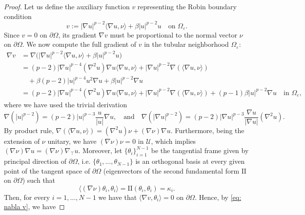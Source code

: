 \documentclass[10pt,a4paper, reqno]{amsart}
\numberwithin{equation}{section}
\begin{document}
\begin{proof}
    Let us define the auxiliary function $v$ representing the Robin boundary condition
    \begin{equation*}
    v := |\nabla u|^{p-2} \langle \nabla u, \nu \rangle + \beta |u|^{p-2}u \quad \text{on } \Omega_\varepsilon.
    \end{equation*}
    Since $v = 0$ on $\partial\Omega$, its gradient $\nabla v$ must be proportional to the normal vector $\nu$ on $\partial\Omega$. We now compute the full gradient of $v$ in the tubular neighborhood $\Omega_\varepsilon$:
    \begin{equation}\label{eq: nabla v}
        \begin{aligned}
        \nabla v &= \nabla \big( |\nabla u|^{p-2} \langle \nabla u, \nu \rangle + \beta |u|^{p-2}u \big)  \\
        &= (p-2)|\nabla u|^{p-4} (\nabla^2 u)\nabla u \langle \nabla u, \nu \rangle + |\nabla u|^{p-2} \nabla ( \langle \nabla u, \nu \rangle ) \\
        &\quad + \beta (p-2)|u|^{p-4}u^2 \nabla u + \beta|u|^{p-2}\nabla u \\
        &= (p-2)|\nabla u|^{p-4} (\nabla^2 u)\nabla u \langle \nabla u, \nu \rangle + |\nabla u|^{p-2} \nabla ( \langle \nabla u, \nu \rangle ) 
        + (p-1) \beta |u|^{p-2} \nabla u \quad \text{in } \Omega_\varepsilon,
        \end{aligned}
    \end{equation}
    where we have used the trivial derivation
    \begin{equation*}
        \nabla (|u|^{p-2}) = (p-2) |u|^{p-3} \frac{u}{|u|} \nabla u, \quad \text{and} \quad \nabla (|\nabla u|^{p-2}) = (p-2) |\nabla u|^{p-3} \frac{\nabla u}{|\nabla u|} (\nabla^2 u).
    \end{equation*}
    By product rule, $\nabla (\langle \nabla u, \nu \rangle) = (\nabla^2 u) \nu + (\nabla \nu) \nabla u$. Furthermore, being the extension of $\nu$ unitary, we have $(\nabla \nu)\nu = 0$ in $\mathcal{U}$, which implies $(\nabla \nu)\nabla u = (\nabla \nu)\nabla_\top u$.
    Moreover, let $\{\theta_i\}_{i=1}^{N-1}$ be the tangential frame given by principal direction of $\partial\Omega$, i.e. $\{ \theta_1, \dots, \theta_{N-1} \}$ is an orthogonal basis at every given point of the tangent space of $\partial\Omega$ (eigenvectors of the second fundamental form $\mathrm{I\!I}$ on $\partial\Omega$) such that 
    \[
    \langle (\nabla \nu) \theta_i, \theta_i \rangle = \mathrm{I\!I}(\theta_i,\theta_i) = \kappa_i.
    \]
    Then, for every $i=1,\dots,N-1$ we have that $\langle \nabla v, \theta_i \rangle = 0$ on $\partial\Omega$. Hence, by \eqref{eq: nabla v}, we have 

\end{proof}
\end{document}
